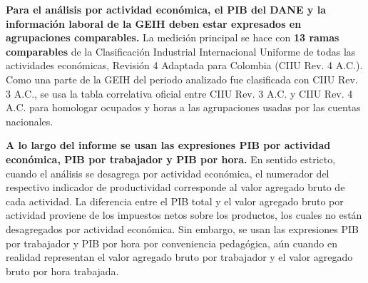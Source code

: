 \textbf{Para el análisis por actividad económica, el PIB del DANE y la información laboral de la GEIH deben estar expresados en agrupaciones comparables.} La medición principal se hace con \textbf{13 ramas comparables} de la Clasificación Industrial Internacional Uniforme de todas las actividades económicas, Revisión 4 Adaptada para Colombia (CIIU Rev. 4 A.C.). %
Como una parte de la GEIH del periodo analizado fue clasificada con CIIU Rev. 3 A.C., se usa la tabla correlativa oficial entre CIIU Rev. 3 A.C. y CIIU Rev. 4 A.C. para homologar ocupados y horas a las agrupaciones usadas por las cuentas nacionales. %

\textbf{A lo largo del informe se usan las expresiones PIB por actividad económica, PIB por trabajador y PIB por hora.} En sentido estricto, cuando el análisis se desagrega por actividad económica, el numerador del respectivo indicador de productividad corresponde al valor agregado bruto de cada actividad. La diferencia entre el PIB total y el valor agregado bruto por actividad proviene de los impuestos netos sobre los productos, los cuales no están desagregados por actividad económica. Sin embargo, se usan las expresiones PIB por trabajador y PIB por hora por conveniencia pedagógica, aún cuando en realidad representan el valor agregado bruto por trabajador y el valor agregado bruto por hora trabajada. 



